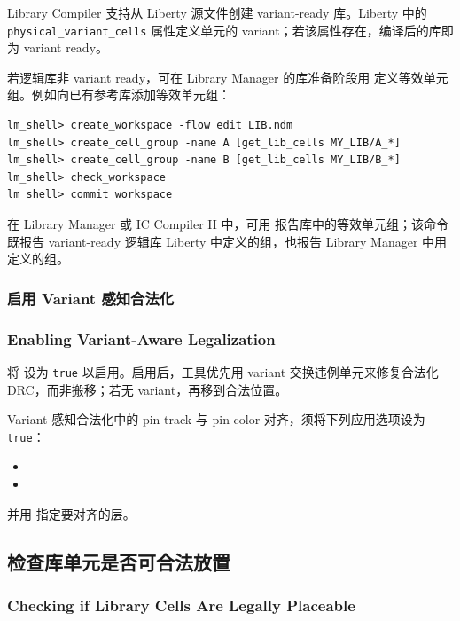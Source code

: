 Library Compiler 支持从 Liberty 源文件创建 variant-ready 库。Liberty 中的 \texttt{physical\_variant\_cells} 属性定义单元的 variant；若该属性存在，编译后的库即为 variant ready。

若逻辑库非 variant ready，可在 Library Manager 的库准备阶段用  定义等效单元组。例如向已有参考库添加等效单元组：
\begin{lstlisting}
lm_shell> create_workspace -flow edit LIB.ndm
lm_shell> create_cell_group -name A [get_lib_cells MY_LIB/A_*]
lm_shell> create_cell_group -name B [get_lib_cells MY_LIB/B_*]
lm_shell> check_workspace
lm_shell> commit_workspace
\end{lstlisting}

在 Library Manager 或 IC Compiler II 中，可用  报告库中的等效单元组；该命令既报告 variant-ready 逻辑库 Liberty 中定义的组，也报告 Library Manager 中用  定义的组。

\subsubsection{启用 Variant 感知合法化}
\subsubsection*{Enabling Variant-Aware Legalization}

将  设为 \texttt{true} 以启用。启用后，工具优先用 variant 交换违例单元来修复合法化 DRC，而非搬移；若无 variant，再移到合法位置。

Variant 感知合法化中的 pin-track 与 pin-color 对齐，须将下列应用选项设为 \texttt{true}：
\begin{itemize}
  \item {}
  \item {}
\end{itemize}
并用  指定要对齐的层。

\subsection{检查库单元是否可合法放置}
\subsubsection*{Checking if Library Cells Are Legally Placeable}

